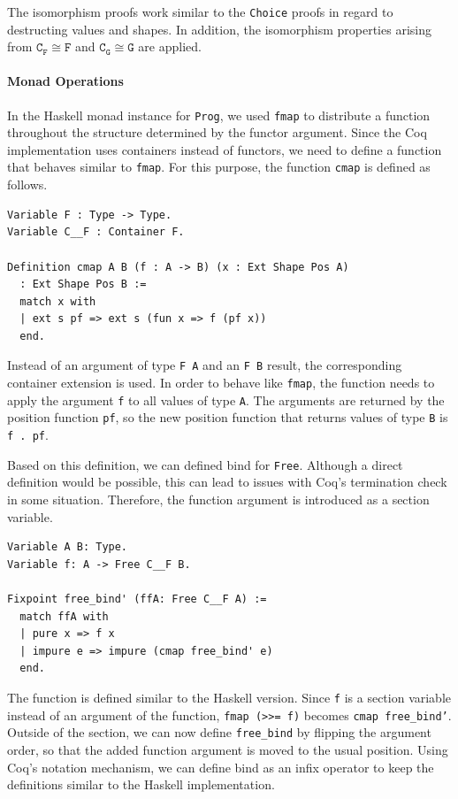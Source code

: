 \documentclass[a4paper, 11pt, fleqn, twoside]{scrreprt}
\newcommand{\hinl}[1]{\texttt{#1}}
\newcommand{\cinl}[1]{\texttt{#1}}
\begin{document}
The isomorphism proofs work similar to the \cinl{Choice} proofs in regard to destructing values and shapes.
In addition, the isomorphism properties arising from $\texttt{C}_\texttt{F} \cong \texttt{F}$ and $\texttt{C}_\texttt{G} \cong \texttt{G}$ are applied.

\paragraph{Monad Operations}
In the Haskell monad instance for \hinl{Prog}, we used \hinl{fmap} to distribute a function throughout the structure determined by the functor argument.
Since the Coq implementation uses containers instead of functors, we need to define a function that behaves similar to \hinl{fmap}.
For this purpose, the function \cinl{cmap} is defined as follows.

\begin{verbatim}
Variable F : Type -> Type.
Variable C__F : Container F.

Definition cmap A B (f : A -> B) (x : Ext Shape Pos A) 
  : Ext Shape Pos B :=
  match x with
  | ext s pf => ext s (fun x => f (pf x))
  end.
\end{verbatim}

Instead of an argument of type \cinl{F A} and an \cinl{F B} result, the corresponding container extension is used.
In order to behave like \hinl{fmap}, the function needs to apply the argument \cinl{f} to all values of type \cinl{A}.
The arguments are returned by the position function \cinl{pf}, so the new position function that returns values of type \cinl{B} is \cinl{f . pf}.

Based on this definition, we can defined bind for \cinl{Free}.
Although a direct definition would be possible, this can lead to issues with Coq's termination check in some situation.
Therefore, the function argument is introduced as a section variable.

\begin{verbatim}
Variable A B: Type.
Variable f: A -> Free C__F B.

Fixpoint free_bind' (ffA: Free C__F A) :=
  match ffA with
  | pure x => f x
  | impure e => impure (cmap free_bind' e)
  end.
\end{verbatim}

The function is defined similar to the Haskell version.
Since \cinl{f} is a section variable instead of an argument of the function, \hinl{fmap (>>= f)} becomes \cinl{cmap free_bind'}.
Outside of the section, we can now define \cinl{free_bind} by flipping the argument order, so that the added function argument is moved to the usual position.
Using Coq's notation mechanism, we can define bind as an infix operator to keep the definitions similar to the Haskell implementation.
\end{document}
